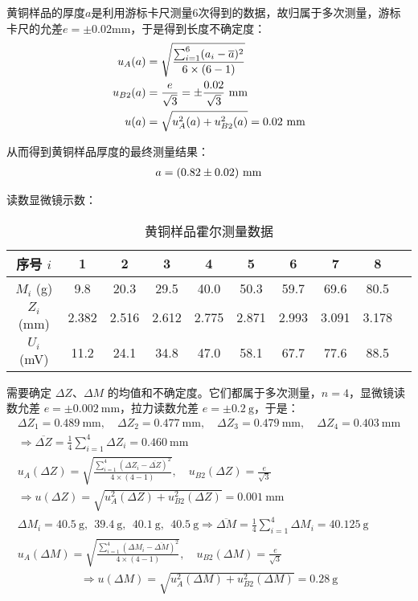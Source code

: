 \documentclass[11pt]{article}
\begin{document}
	黄铜样品的厚度$a$是利用游标卡尺测量6次得到的数据，故归属于多次测量，游标卡尺的允差$e=\pm 0.02$mm，于是得到长度不确定度：
	\begin{align*}
		u_A(a) &=\sqrt{\frac{\sum_{i=1}^6(a_i-\overline a)^2}{6\times(6-1)}}\\
		u_{B2}(a) &=\frac{e}{\sqrt 3}=\pm \frac{0.02}{\sqrt 3} \,\,{\rm mm}\\
		u(a)&=
		\sqrt{u_{A}^2(a)+u^2_{B2}(a)} 
		=0.02 \,\,{\rm mm}
	\end{align*}
	
	从而得到黄铜样品厚度的最终测量结果：
	\begin{align*}
		a=(0.82\pm 0.02)\,\, {\rm mm} 
	\end{align*}
	
	读数显微镜示数：
	\begin{table}[H]\centering
		\caption{黄铜样品霍尔测量数据}
		\label{黄铜样品霍尔测量数据}
		\begin{tabular}{cccccccccc}\toprule
			序号 $i$ & 1 & 2 & 3 & 4 & 5 & 6 & 7 & 8  \\
			\midrule
			$M_i$ (g)   & 9.8 & 20.3 & 29.5 & 40.0 & 50.3 & 59.7 & 69.6 & 80.5    \\
			$Z_i$  (mm) & 2.382 & 2.516 & 2.612 & 2.775 & 2.871 & 2.993 & 3.091 & 3.178    \\
			$U_i$  (mV) & 11.2 & 24.1 & 34.8 & 47.0 & 58.1 & 67.7 & 77.6 & 88.5    \\
			\bottomrule
		\end{tabular}
	\end{table}
	
	需要确定 $\Delta Z$、$\Delta M$ 的均值和不确定度。它们都属于多次测量，$n = 4$，显微镜读数允差 $e = \pm 0.002 \ \mathrm{mm}$，拉力读数允差 $e = \pm 0.2 \ \mathrm{g}$，于是：
	\begin{gather*}
		\Delta Z_1 = 0.489 \ \mathrm{mm},\quad \Delta Z_2 = 0.477\ \mathrm{mm},\quad \Delta Z_3 = 0.479 \ \mathrm{mm},\quad \Delta Z_4 = 0.403 \ \mathrm{mm} \\ 
		\Longrightarrow
		\overline{\Delta Z} = \frac{1}{4}\sum_{i=1}^{4}\Delta Z_i = 0.460 \ \mathrm{mm} \\ 
		u_A(\Delta Z) = \sqrt{\frac{\sum_{i=1}^{4}\left(\Delta Z_i - \overline{\Delta Z}\right)^2}{4\times (4 - 1)}} ,\quad u_{B2}(\Delta Z) =  \frac{e}{\sqrt{3}} \\ 
		\Longrightarrow u(\Delta Z) = \sqrt{u_A^2(\Delta Z) + u_{B2}^2(\Delta Z)} = 0.001 \ \mathrm{mm} 
		\\ 
		\Delta M_i = 40.5 \ \mathrm{g},\ \  39.4 \ \mathrm{g},\ \  40.1 \ \mathrm{g},\ \  40.5\ \mathrm{g} 
		\Longrightarrow
		\overline{\Delta M} = \frac{1}{4}\sum_{i=1}^{4}\Delta M_i = 40.125 \ \mathrm{g} \\ 
		u_A(\Delta M) = \sqrt{\frac{\sum_{i=1}^{4}\left(\Delta M_i - \overline{\Delta M}\right)^2}{4\times (4 - 1)}} ,\quad u_{B2}(\Delta M) =  \frac{e}{\sqrt{3}}
	\end{gather*}
	\begin{gather*}
		\Longrightarrow u(\Delta M) = \sqrt{u_A^2(\Delta M) + u_{B2}^2(\Delta M)} = 0.28 \ \mathrm{g}
	\end{gather*}
	
\end{document}
